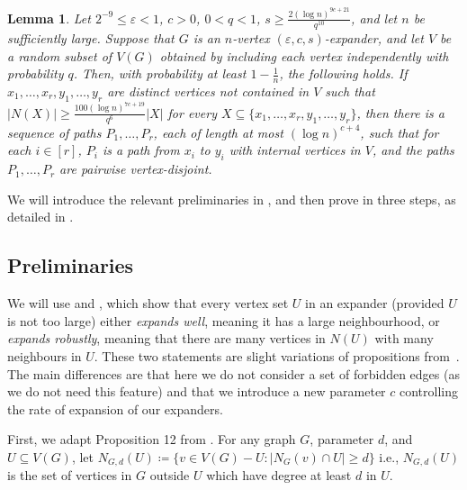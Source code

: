\documentclass[10pt]{article}
\theoremstyle{plain}
\numberwithin{theorem}{section}
\newtheorem{lemma}[theorem]{Lemma}
\theoremstyle{definition}
\theoremstyle{remark}
\renewcommand{\setminus}{-}
\newcommand{\eps}{\varepsilon}
\theoremstyle{plain}
\begin{document}
	\begin{lemma} \label{lem:connecting}
		Let $2^{-9} \le \eps < 1$, $c > 0$, $0 < q < 1$, $s \ge \frac{2 (\log n)^{9c+21}}{q^{10}}$, and let $n$ be sufficiently large. Suppose that $G$ is an $n$-vertex $(\eps, c, s)$-expander, and let $V$ be a random subset of $V(G)$ obtained by including each vertex independently with probability $q$. Then, with probability at least $1 - \frac{1}{n}$, the following holds. If $x_1, \ldots, x_r, y_1, \ldots, y_r$ are distinct vertices not contained in $V$ such that $|N(X)| \ge \frac{100 (\log n)^{7c+19}}{q^6}|X|$ for every $X \subseteq \{x_1, \ldots, x_r, y_1, \ldots, y_r\}$, then there is a sequence of paths $P_1, \ldots, P_r$, each of length at most $(\log n)^{c+4}$, such that for each $i \in [r]$, $P_i$ is a path from $x_i$ to $y_i$ with internal vertices in $V$, and the paths $P_1, \ldots, P_r$ are pairwise vertex-disjoint.
	\end{lemma}

	We will introduce the relevant preliminaries in , and then prove  in three steps, as detailed in .

\subsection{Preliminaries} \label{subsec:prelims}

We will use  and , which show that every vertex set $U$ in an expander (provided $U$ is not too large) either \emph{expands well}, meaning it has a large neighbourhood, or \emph{expands robustly}, meaning that there are many vertices in $N(U)$ with many neighbours in $U$. These two statements are slight variations of propositions from~\cite{bucic2022erdos}. The main differences are that here we do not consider a set of forbidden edges (as we do not need this feature) and that we introduce a new parameter $c$ controlling the rate of expansion of our expanders.


First, we adapt Proposition 12 from \cite{bucic2022erdos}. For any graph $G$, parameter $d$, and $U \subseteq V(G)$, let $N_{G,d}(U) \coloneqq \{v \in V (G) \setminus U : |N_G(v) \cap U| \ge d\}$ i.e., $N_{G,d}(U)$ is the set of vertices in $G$ outside $U$ which have degree at least $d$ in $U$.
\end{document}
